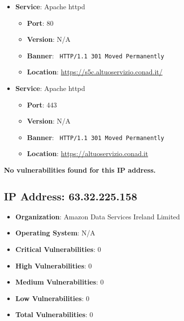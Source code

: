 \documentclass{article}
\begin{document}
\begin{itemize}
    
        \item \textbf{Service}: Apache httpd
        \begin{itemize}
            \item \textbf{Port}: 80
            \item \textbf{Version}:  N/A 
            \item \textbf{Banner}: \texttt{ HTTP/1.1 301 Moved Permanently
 }
            \item \textbf{Location}: \href{ https://s5c.altuoservizio.conad.it/ }{ https://s5c.altuoservizio.conad.it/ }
        \end{itemize}
    
        \item \textbf{Service}: Apache httpd
        \begin{itemize}
            \item \textbf{Port}: 443
            \item \textbf{Version}:  N/A 
            \item \textbf{Banner}: \texttt{ HTTP/1.1 301 Moved Permanently
 }
            \item \textbf{Location}: \href{ https://altuoservizio.conad.it }{ https://altuoservizio.conad.it }
        \end{itemize}
    
\end{itemize}


\textbf{No vulnerabilities found for this IP address.}


\clearpage



\subsection*{IP Address: 63.32.225.158}

\begin{itemize}
    \item \textbf{Organization}: Amazon Data Services Ireland Limited
    \item \textbf{Operating System}:  N/A 
    \item \textbf{Critical Vulnerabilities}: 0
    \item \textbf{High Vulnerabilities}: 0
    \item \textbf{Medium Vulnerabilities}: 0
    \item \textbf{Low Vulnerabilities}: 0
    \item \textbf{Total Vulnerabilities}: 0
\end{itemize}
\end{document}
